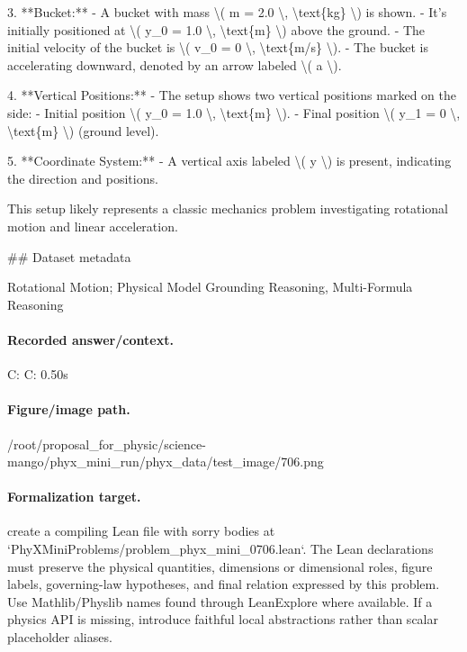 3. **Bucket:**
   - A bucket with mass \textbackslash{}( m = 2.0 \textbackslash{}, \textbackslash{}text\{kg\} \textbackslash{}) is shown.
   - It’s initially positioned at \textbackslash{}( y\_0 = 1.0 \textbackslash{}, \textbackslash{}text\{m\} \textbackslash{}) above the ground.
   - The initial velocity of the bucket is \textbackslash{}( v\_0 = 0 \textbackslash{}, \textbackslash{}text\{m/s\} \textbackslash{}).
   - The bucket is accelerating downward, denoted by an arrow labeled \textbackslash{}( a \textbackslash{}).

4. **Vertical Positions:**
   - The setup shows two vertical positions marked on the side:
     - Initial position \textbackslash{}( y\_0 = 1.0 \textbackslash{}, \textbackslash{}text\{m\} \textbackslash{}).
     - Final position \textbackslash{}( y\_1 = 0 \textbackslash{}, \textbackslash{}text\{m\} \textbackslash{}) (ground level).

5. **Coordinate System:**
   - A vertical axis labeled \textbackslash{}( y \textbackslash{}) is present, indicating the direction and positions.

This setup likely represents a classic mechanics problem investigating rotational motion and linear acceleration.

\#\# Dataset metadata

Rotational Motion; Physical Model Grounding Reasoning, Multi-Formula Reasoning

\paragraph{Recorded answer/context.}
C: C: 0.50s

\paragraph{Figure/image path.}
/root/proposal\_for\_physic/science-mango/phyx\_mini\_run/phyx\_data/test\_image/706.png

\paragraph{Formalization target.}
create a compiling Lean file with sorry bodies at `PhyXMiniProblems/problem\_phyx\_mini\_0706.lean`. The Lean declarations must preserve the physical quantities, dimensions or dimensional roles, figure labels, governing-law hypotheses, and final relation expressed by this problem.
Use Mathlib/Physlib names found through LeanExplore where available. If a physics API is missing, introduce faithful local abstractions rather than scalar placeholder aliases.

